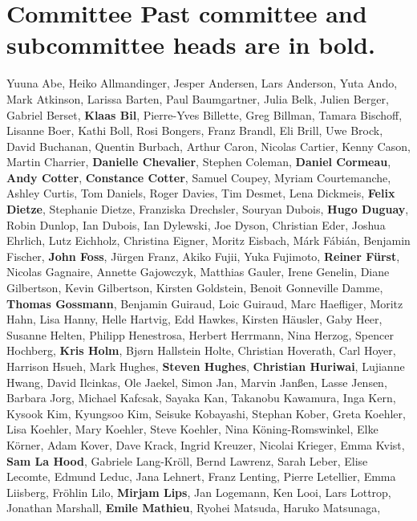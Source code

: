 \section*{Committee \textnormal{\small \quad Past committee and subcommittee heads are in bold.}} %
\vspace{-2pt}
\begingroup
\fontsize{9pt}{9pt}\selectfont
Yuuna Abe,
Heiko Allmandinger,
Jesper Andersen,
Lars Anderson,
Yuta Ando,
Mark Atkinson,
Larissa Barten,
Paul Baumgartner,
Julia Belk,
Julien Berger,
Gabriel Berset,
\textbf{Klaas Bil},
Pierre-Yves Billette,
Greg Billman,
Tamara Bischoff,
Lisanne Boer,
Kathi Boll,
Rosi Bongers,
Franz Brandl,
Eli Brill,
Uwe Brock,
David Buchanan,
Quentin Burbach,
Arthur Caron,
Nicolas Cartier,
Kenny Cason,
Martin Charrier,
\textbf{Danielle Chevalier},
Stephen Coleman,
\textbf{Daniel Cormeau},
\textbf{Andy Cotter},
\textbf{Constance Cotter},
Samuel Coupey,
Myriam Courtemanche,
Ashley Curtis,
Tom Daniels,
Roger Davies,
Tim Desmet,
Lena Dickmeis,
\textbf{Felix Dietze},
Stephanie Dietze,
Franziska Drechsler,
Souryan Dubois,
\textbf{Hugo Duguay},
Robin Dunlop,
Ian Dubois,
Ian Dylewski,
Joe Dyson,
Christian Eder,
Joshua Ehrlich,
Lutz Eichholz,
Christina Eigner,
Moritz Eisbach,
Márk Fábián,
Benjamin Fischer,
\textbf{John Foss},
Jürgen Franz,
Akiko Fujii,
Yuka Fujimoto,
\textbf{Reiner Fürst},
Nicolas Gagnaire,
Annette Gajowczyk,
Matthias Gauler,
Irene Genelin,
Diane Gilbertson,
Kevin Gilbertson,
Kirsten Goldstein,
Benoit Gonneville Damme,
\textbf{Thomas Gossmann},
Benjamin Guiraud,
Loic Guiraud,
Marc Haefliger,
Moritz Hahn,
Lisa Hanny,
Helle Hartvig,
Edd Hawkes,
Kirsten Häusler,
Gaby Heer,
Susanne Helten,
Philipp Henestrosa,
Herbert Herrmann,
Nina Herzog,
Spencer Hochberg,
\textbf{Kris Holm},
Bjørn Hallstein Holte,
Christian Hoverath,
Carl Hoyer,
Harrison Hsueh,
Mark Hughes,
\textbf{Steven Hughes},
\textbf{Christian Huriwai},
Lujianne Hwang,
David Ilcinkas,
Ole Jaekel,
Simon Jan,
Marvin Janßen,
Lasse Jensen,
Barbara Jorg,
Michael Kafcsak,
Sayaka Kan,
Takanobu Kawamura,
Inga Kern,
Kysook Kim,
Kyungsoo Kim,
Seisuke Kobayashi,
Stephan Kober,
Greta Koehler,
Lisa Koehler,
Mary Koehler,
Steve Koehler,
Nina Köning-Romswinkel,
Elke Körner,
Adam Kover,
Dave Krack,
Ingrid Kreuzer,
Nicolai Krieger,
Emma Kvist,
\textbf{Sam La Hood},
Gabriele Lang-Kröll,
Bernd Lawrenz,
Sarah Leber,
Elise Lecomte,
Edmund Leduc,
Jana Lehnert,
Franz Lenting,
Pierre Letellier,
Emma Liisberg,
Fröhlin Lilo,
\textbf{Mirjam Lips},
Jan Logemann,
Ken Looi,
Lars Lottrop,
Jonathan Marshall,
\textbf{Emile Mathieu},
Ryohei Matsuda,
Haruko Matsunaga,
